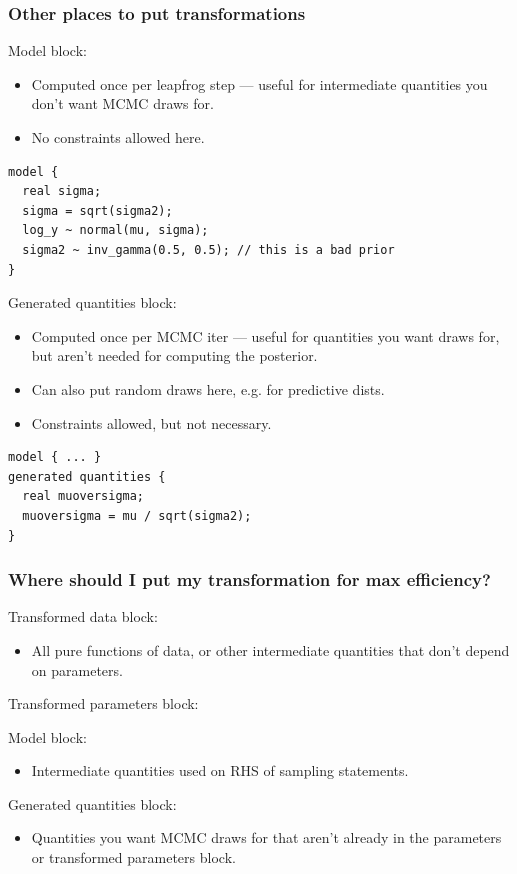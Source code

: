 \documentclass[xcolor=dvipsnames]{beamer}
\begin{document}
\begin{frame}[fragile]
\frametitle{Other places to put transformations}
Model block:
\begin{itemize}
\item Computed once per leapfrog step --- useful for intermediate quantities you don't want MCMC draws for.
\item No constraints allowed here.
\end{itemize}
{\tiny
\begin{verbatim}
model {
  real sigma;
  sigma = sqrt(sigma2);
  log_y ~ normal(mu, sigma);
  sigma2 ~ inv_gamma(0.5, 0.5); // this is a bad prior
}
\end{verbatim}
}
Generated quantities block:
\begin{itemize}
\item Computed once per MCMC iter --- useful for quantities you want draws for, but aren't needed for computing the posterior.
\item Can also put random draws here, e.g. for predictive dists.
\item Constraints allowed, but not necessary.
\end{itemize}
{\tiny
\begin{verbatim}
model { ... }
generated quantities {
  real muoversigma;
  muoversigma = mu / sqrt(sigma2);
}
\end{verbatim}
}
\end{frame}

\begin{frame}[fragile]
\frametitle{Where should I put my transformation for max efficiency?}
Transformed data block:
\begin{itemize}
\item All pure functions of data, or other intermediate quantities that don't depend on parameters.
\end{itemize}
Transformed parameters block:
Model block:
\begin{itemize}
\item Intermediate quantities used on RHS of sampling statements.
\end{itemize}
Generated quantities block:
\begin{itemize}
\item Quantities you want MCMC draws for that aren't already in the parameters or transformed parameters block.
\end{itemize}
\end{frame}
\end{document}
